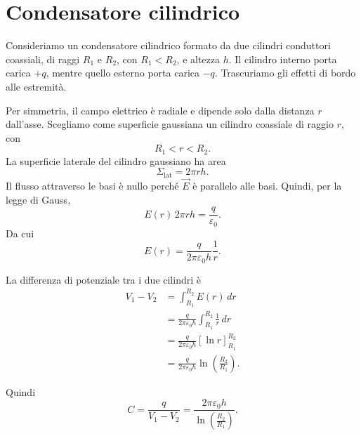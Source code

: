 \documentclass[a4paper]{article}
\begin{document}
\section{Condensatore cilindrico}

Consideriamo un condensatore cilindrico formato da due cilindri conduttori coassiali, di raggi \(R_1\) e \(R_2\), con \(R_1<R_2\), e altezza \(h\). Il cilindro interno porta carica \(+q\), mentre quello esterno porta carica \(-q\). Trascuriamo gli effetti di bordo alle estremità.

\begin{center}
\end{center}

Per simmetria, il campo elettrico è radiale e dipende solo dalla distanza \(r\) dall'asse. Scegliamo come superficie gaussiana un cilindro coassiale di raggio \(r\), con
\[
    R_1<r<R_2.
\]
La superficie laterale del cilindro gaussiano ha area
\[
    \Sigma_{\mathrm{lat}}=2\pi r h.
\]
Il flusso attraverso le basi è nullo perché \(\vec{E}\) è parallelo alle basi. Quindi, per la legge di Gauss,
\[
    E(r)\,2\pi rh=\frac{q}{\varepsilon_0}.
\]
Da cui
\[
    E(r)=\frac{q}{2\pi\varepsilon_0h}\frac{1}{r}.
\]

La differenza di potenziale tra i due cilindri è
\begin{align*}
    V_1-V_2
    &=\int_{R_1}^{R_2} E(r)\,dr \\
    &=\frac{q}{2\pi\varepsilon_0h}\int_{R_1}^{R_2}\frac{1}{r}\,dr \\
    &=\frac{q}{2\pi\varepsilon_0h}\left[\ln r\right]_{R_1}^{R_2} \\
    &=\frac{q}{2\pi\varepsilon_0h}\ln\left(\frac{R_2}{R_1}\right).
\end{align*}

Quindi
\[
    C=\frac{q}{V_1-V_2}
    =\frac{2\pi\varepsilon_0h}{\ln\left(\frac{R_2}{R_1}\right)}.
\]
\end{document}
